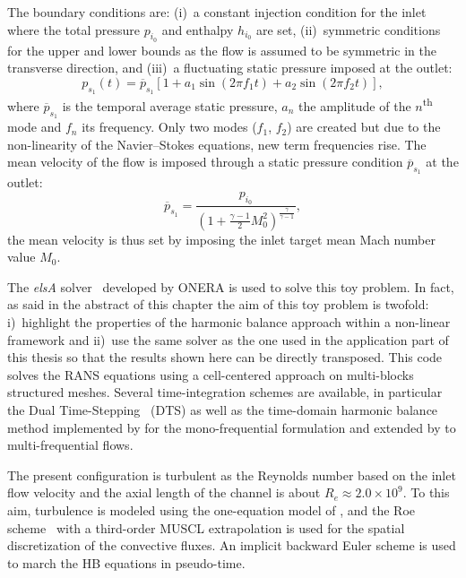 The boundary conditions are: (i)~a constant injection condition for the inlet
where the total pressure $p_{i_0}$ and enthalpy $h_{i_0}$ are set,
(ii)~symmetric conditions for the upper and lower bounds as the flow
is assumed to be symmetric in the transverse direction, and (iii)~a
fluctuating static pressure imposed at the outlet:
\begin{equation}
  p_{s_1}(t) = \overline{p}_{s_1} \left[1 + a_1 \sin(2 \pi f_1 t) +
    a_2 \sin(2 \pi f_2 t) \right],
  \label{eq:outlet_canal}
\end{equation}
where $\overline{p}_{s_1}$ is the temporal average static pressure, $a_n$ the
amplitude of the $n$\textsuperscript{th} mode and $f_n$ its
frequency. Only two modes ($f_1$, $f_2$) are created
but due to the non-linearity of the Navier--Stokes equations,
new term frequencies rise.
The mean velocity of the flow is imposed through a
static pressure condition $\overline{p}_{s_1}$ at the outlet:
\begin{equation}
    \overline{p}_{s_1} = \frac{p_{i_0}}{\left(1 + 
    \frac{\gamma - 1}{2} M_{0}^2 \right) ^ {\frac{\gamma}{ \gamma - 1}}} ,
\end{equation}
the mean velocity is thus set by imposing the
inlet target mean Mach number value $M_{0}$.

The \emph{elsA} solver~\cite{Cambier2013} developed by ONERA
is used to solve this toy problem. In fact, as said in the
abstract of this chapter the aim of this toy problem is 
twofold: i)~highlight the properties of the harmonic balance
approach within a non-linear framework and ii)~use the same
solver as the one used in the application part of this
thesis so that the results shown here can be directly
transposed. 
This code solves the RANS equations using a cell-centered
approach on multi-blocks structured meshes.
Several time-integration schemes
are available, in particular the Dual Time-Stepping~\cite{Jameson1981} (DTS)
as well as the time-domain harmonic 
balance method implemented by \citet{JSicot2008} for the mono-frequential
formulation and extended by \citet{JGuedeney2013} to multi-frequential flows. 


The present configuration is turbulent as the Reynolds number based on the
inlet flow velocity and the axial length of the channel is about $R_e
\approx 2.0 \times 10^9$. To this aim, turbulence is modeled using the
one-equation model of \citet{Spalart1992}, and the
Roe scheme~\cite{Roe1981} with a third-order MUSCL extrapolation 
is used for the spatial discretization of
the convective fluxes. An implicit backward Euler scheme is used
to march the HB equations in pseudo-time.


